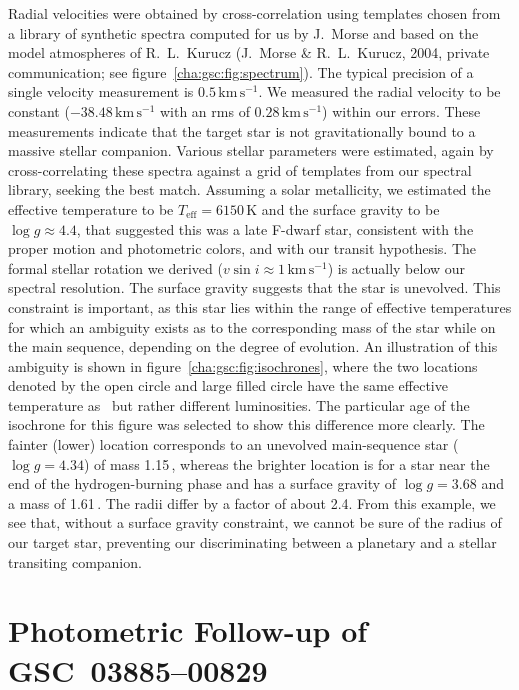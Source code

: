 Radial velocities were obtained by cross-correlation using templates
chosen from a library of synthetic spectra computed for us by J.~Morse
and based on the model atmospheres of R.~L.~Kurucz (J.~Morse \&
R.~L.~Kurucz, 2004, private communication; see figure~\ref{cha:gsc:fig:spectrum}). The typical precision of a
single velocity measurement is $0.5\,\mathrm{km\,s^{-1}}$. We measured
the radial velocity to be constant ($-38.48\,\mathrm{km\,s^{-1}}$ with
an rms of $0.28\,\mathrm{km\,s^{-1}}$) within our errors. These
measurements indicate that the target star is not gravitationally
bound to a massive stellar companion. Various stellar parameters were
estimated, again by cross-correlating these spectra against a grid of
templates from our spectral library, seeking the best match.  Assuming
a solar metallicity, we estimated the effective temperature to be
$T_{\mathrm{eff}}=6150$\,K and the surface gravity to be $\log{g}
\approx 4.4$, that suggested this was a late F-dwarf star, consistent
with the proper motion and photometric colors, and with our transit
hypothesis. The formal stellar rotation we derived ($v\sin{i} \approx
1\,\mathrm{km\,s^{-1}}$) is actually below our spectral
resolution. The surface gravity suggests that the star is unevolved. This
constraint is important, as this star lies within the range of
effective temperatures for which an ambiguity exists as to the
corresponding mass of the star while on the main sequence, depending
on the degree of evolution. An illustration of this ambiguity is shown
in figure~\ref{cha:gsc:fig:isochrones}, where the two locations denoted by the
open circle and large filled circle have the same effective
temperature as \gscOTE\ but rather different luminosities. The particular
age of the isochrone for this figure was selected to show this
difference more clearly. The fainter (lower) location corresponds to
an unevolved main-sequence star ($\log{g}=4.34$) of mass
1.15\,\msun, whereas the brighter location is for a star near the
end of the hydrogen-burning phase and has a surface gravity of
$\log{g}=3.68$ and a mass of 1.61\,\msun. The radii differ by a
factor of about 2.4. From this example, we see that, without a surface
gravity constraint, we cannot be sure of the radius of our target
star, preventing our discriminating between a planetary and a stellar
transiting companion.

\section{Photometric Follow-up of \mbox{GSC 03885--00829}}\label{cha:gsc:sec:photo}

